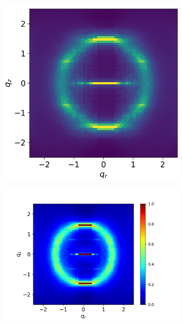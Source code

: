 \documentclass{article}
\begin{document}
  \begin{figure}[!ht]
	\centering
	\begin{subfigure}{0.31\textwidth}
		\centering
		\hspace{-0.9cm}
		\includegraphics[width=\textwidth]{sandwich_rzplot.png}
		\caption{}\label{fig:sandwich_rzplot}
	\end{subfigure}
	\begin{subfigure}{0.31\textwidth}
		\centering
		\hspace{-0.9cm}
		\includegraphics[width=\textwidth]{offset_rzplot.png}

\end{subfigure}
\end{figure}
\end{document}
